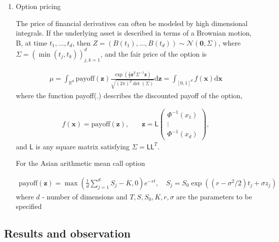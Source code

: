 \documentclass[twocolumn]{svjour3}          %
\newcommand{\bm}[1]{\boldsymbol{#1}}
\newcommand{\mSigma}{\Sigma}
\newcommand{\dif}[1]{\text{d}{#1}}
\newcommand{\reals}{\mathbb{R}}
\newcommand{\vx}{\bm{x}}
\newcommand{\dvx}{\dif{\bm{x}}}
\newcommand{\vz}{\bm{z}}
\newcommand{\dvz}{\dif{\bm{z}}}
\newcommand{\vzero}{\bm{0}}
\newcommand{\mL}{\mathsf{L}}
\newcommand{\calN}{\mathcal{N}}
\begin{document}
\begin{enumerate}







\item Option pricing


The price of financial derivatives can often be modeled by high dimensional integrals. If the underlying asset is described in terms of a Brownian motion, B, at time $t_1,...,t_d$, then $Z = (B(t_1), ..., B(t_d)) \sim \calN(\vzero,\mSigma)$, where $\mSigma = \left(\min(t_j,t_k) \right)_{j,k=1}^d$, and the fair price of the option is

\begin{align*}
\mu = \int_{\reals^d} \text{payoff}(\vz) \frac{\exp(\frac 12 \vz^T\mSigma^{-1}\vz)}{\sqrt{(2\pi)^d \det(\mSigma)}} \dvz = \int_{[0,1]^d} f(\vx) \dvx
\end{align*}
where the function payoff(.) describes the discounted payoff of the option,


\begin{align*}
f(\vx) = \text{payoff}(\vz), & \quad \vz = \mL 
\begin{pmatrix}
\Phi^{-1}(x_1) \\ \vdots \\ \Phi^{-1}(x_d)
\end{pmatrix},
\end{align*}
and $\mL$ is any square matrix satisfying $\mSigma = \mL \mL^T$.

For the Asian arithmetic mean call option

\begin{align*}
\text{payoff}(\vz) = \max\left( \frac 1d  \sum_{j=1}^d S_j - K, 0 \right) e^{-r t}, \quad
S_j = S_0 \exp((r-\sigma^2/2)t_j + \sigma z_j )
\end{align*}
where $d$ - number of dimensions and $T, S, S_0, K, r, \sigma$ are the parameters to be specified


\end{enumerate}














\subsection{Results and observation}
\end{document}
